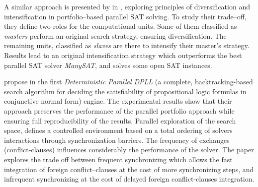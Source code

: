 A similar approach is presented by  in \cite{Guo2010}, exploring principles of diversification and intensification in portfolio--based parallel SAT solving. To study their trade--off, they define two roles for the computational units. Some of them classified as {\it masters} perform an original search strategy, ensuring diversification. The remaining units, classified as {\it slaves} are there to intensify their master's strategy. 
Results lead to an original intensification strategy which outperforms the best parallel SAT solver {\it ManySAT}, and solves some open SAT instances.

 propose in \cite{Hamadi2011} the first {\it Deterministic Parallel DPLL} (a complete, backtracking-based search algorithm for deciding the satisfiability of propositional logic formulas in conjunctive normal form) engine. The experimental results show that their approach preserves the performance of the parallel portfolio approach while ensuring full reproducibility of the results. Parallel exploration of the search space, defines a controlled environment based on a total ordering of solvers interactions through synchronization barriers. The frequency of exchanges (conflict-clauses) influences considerably the performance of the solver. The paper explores the trade off between frequent synchronizing which allows the fast integration of foreign conflict--clauses at the cost of more synchronizing steps, and infrequent synchronizing at the cost of delayed foreign conflict-clauses integration.

